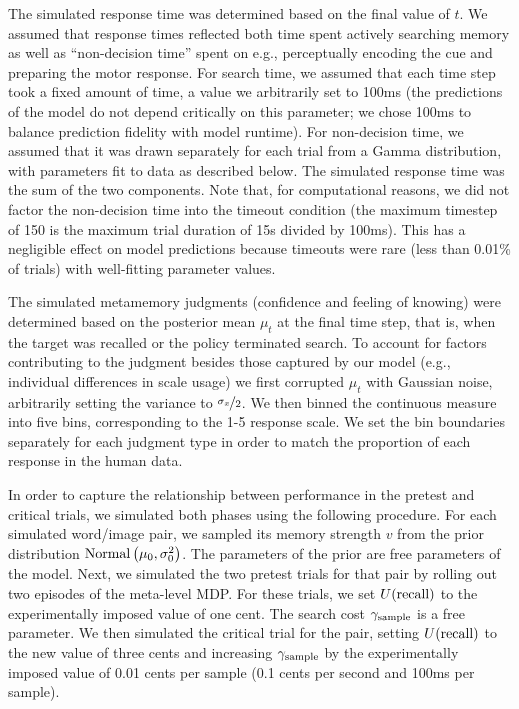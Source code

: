 The simulated response time was determined based on the final value of $t$. We assumed that response times reflected both time spent actively searching memory as well as ``non-decision time'' spent on e.g., perceptually encoding the cue and preparing the motor response. For search time, we assumed that each time step took a fixed amount of time, a value we arbitrarily set to 100ms (the predictions of the model do not depend critically on this parameter; we chose 100ms to balance prediction fidelity with model runtime). For non-decision time, we assumed that it was drawn separately for each trial from a Gamma distribution, with parameters fit to data as described below. The simulated response time was the sum of the two components. Note that, for computational reasons, we did not factor the non-decision time into the timeout condition (the maximum timestep of 150 is the maximum trial duration of 15s divided by 100ms). This has a negligible effect on model predictions because timeouts were rare (less than 0.01\% of trials) with well-fitting parameter values.

The simulated metamemory judgments (confidence and feeling of knowing) were determined based on the posterior mean $\mu_t$ at the final time step, that is, when the target was recalled or the policy terminated search. To account for factors contributing to the judgment besides those captured by our model (e.g., individual differences in scale usage) we first corrupted $\mu_t$ with Gaussian noise, arbitrarily setting the variance to $\nicefrac{\sigma_x}{2}$. We then binned the continuous measure into five bins, corresponding to the 1-5 response scale. We set the bin boundaries separately for each judgment type in order to match the proportion of each response in the human data.

In order to capture the relationship between performance in the pretest and critical trials, we simulated both phases using the following procedure. For each simulated word/image pair, we sampled its memory strength $v$ from the prior distribution $\mathrm{Normal}\left( \mu_0, \sigma_0^2 \right)$. The parameters of the prior are free parameters of the model. Next, we simulated the two pretest trials for that pair by rolling out two episodes of the meta-level MDP. For these trials, we set $U({\text{recall}})$ to the experimentally imposed value of one cent. The search cost $\gamma_\text{sample}$ is a free parameter. We then simulated the critical trial for the pair, setting $U({\text{recall}})$ to the new value of three cents and increasing $\gamma_\text{sample}$ by the experimentally imposed value of 0.01 cents per sample (0.1 cents per second and 100ms per sample).

